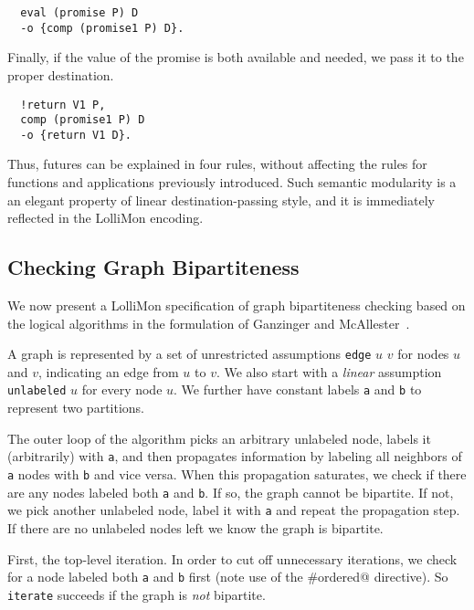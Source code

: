 \documentclass{sig-alt}
\begin{document}
\begin{small}\begin{verbatim}
  eval (promise P) D
  -o {comp (promise1 P) D}.
\end{verbatim}\end{small}
\noindent
Finally, if the value of the promise is both available and needed,
we pass it to the proper destination.

\begin{small}\begin{verbatim}
  !return V1 P,
  comp (promise1 P) D
  -o {return V1 D}.
\end{verbatim}\end{small}

Thus, futures can be explained in four rules, without affecting the rules
for functions and applications previously introduced.  Such semantic
modularity is a an elegant property of linear destination-passing style,
and it is immediately reflected in the LolliMon encoding.

\subsection{Checking Graph Bipartiteness}
\label{ssec:gbc}
We now present a LolliMon specification of graph bipartiteness
checking based on the logical algorithms in the formulation
of Ganzinger and McAllester~\cite{Ganzinger02iclp}.  

A graph is represented by a set of unrestricted assumptions
\texttt{edge} $u$ $v$ for nodes $u$ and $v$, indicating an edge
from $u$ to $v$.  We also start with a \emph{linear} assumption
\texttt{unlabeled} $u$ for every node $u$.  We further have constant
labels \texttt{a} and \texttt{b} to represent two partitions.

The outer loop of the algorithm picks an arbitrary unlabeled node,
labels it (arbitrarily) with \texttt{a}, and then propagates
information by labeling all neighbors of \texttt{a} nodes with
\texttt{b} and vice versa.  When this propagation saturates, we check if
there are any nodes labeled both \texttt{a} and \texttt{b}.  If so, the
graph cannot be bipartite.  If not, we pick another unlabeled node, label
it with \texttt{a} and repeat the propagation step.  If there are no
unlabeled nodes left we know the graph is bipartite.

First, the top-level iteration.  In order to cut off unnecessary
iterations, we check for a node labeled both \texttt{a} and \texttt{b}
first (note use of the \verb@#ordered@ directive).  So
\texttt{iterate} succeeds if the graph is \emph{not} bipartite.
\end{document}
